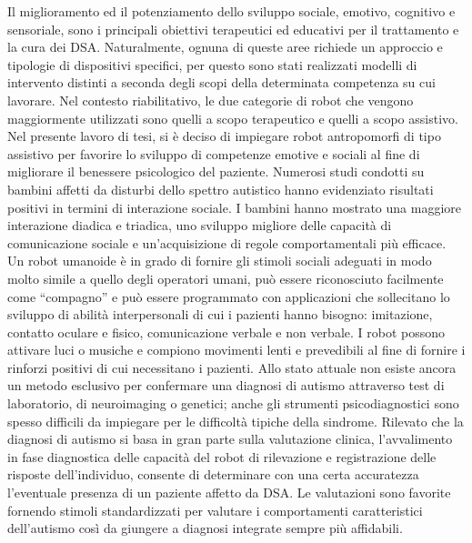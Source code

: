 \begin{sloppypar}
{Il miglioramento ed il potenziamento dello sviluppo sociale, emotivo, cognitivo e sensoriale, sono i principali obiettivi terapeutici ed educativi per il trattamento e la cura dei DSA. Naturalmente, ognuna di queste aree richiede un approccio e tipologie di dispositivi specifici, per questo sono stati realizzati modelli di intervento distinti a seconda degli scopi della determinata competenza su cui lavorare.\newline
Nel contesto riabilitativo, le due categorie di robot che vengono maggiormente utilizzati sono quelli a scopo terapeutico e quelli a scopo assistivo. 
Nel presente lavoro di tesi, si è deciso di impiegare robot antropomorfi di tipo assistivo per favorire lo sviluppo di competenze emotive e sociali al fine di migliorare il benessere psicologico del paziente.\newline
Numerosi studi condotti su bambini affetti da disturbi dello spettro autistico hanno evidenziato risultati positivi in termini di interazione sociale.
I bambini hanno mostrato una maggiore interazione diadica e triadica,  uno sviluppo  migliore delle  capacità  di  comunicazione sociale e un’acquisizione di regole comportamentali più efficace.\newline 
Un robot umanoide è in grado di fornire gli stimoli sociali adeguati in modo molto simile a quello degli operatori umani, può essere riconosciuto facilmente come “compagno” e può essere programmato con applicazioni che sollecitano lo sviluppo di abilità interpersonali di cui i pazienti hanno bisogno: imitazione, contatto oculare e fisico, comunicazione verbale e non verbale. I robot possono attivare luci o musiche e compiono movimenti lenti e prevedibili al fine di fornire i rinforzi positivi di cui necessitano i pazienti.\newline
Allo stato attuale non esiste ancora un metodo esclusivo per confermare una diagnosi di autismo attraverso test di laboratorio, di neuroimaging o genetici; anche gli strumenti psicodiagnostici sono spesso difficili da impiegare per le difficoltà tipiche della sindrome. Rilevato che la diagnosi di autismo si basa in gran parte sulla valutazione clinica, l'avvalimento in fase diagnostica delle capacità del robot di rilevazione e registrazione delle risposte dell'individuo, consente di determinare con una certa accuratezza l'eventuale presenza di un paziente affetto da DSA.\newline
Le valutazioni sono favorite fornendo stimoli standardizzati per valutare i comportamenti caratteristici dell’autismo così da giungere a diagnosi integrate sempre più affidabili. 
}
\end{sloppypar}
